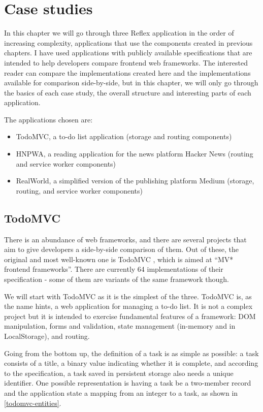 \documentclass[english,odsaz]{fitthesis}
\begin{document}
\chapter{Case studies}
\label{sec:orgefc6417}
In this chapter we will go through three Reflex application in the order of
increasing complexity, applications that use the components created in previous
chapters. I have used applications with publicly available specifications that
are intended to help developers compare frontend web frameworks. The interested
reader can compare the implementations created here and the implementations
available for comparison side-by-side, but in this chapter, we will only go
through the basics of each case study, the overall structure and interesting
parts of each application.

The applications chosen are:
\begin{itemize}
\item TodoMVC, a to-do list application (storage and routing components)
\item HNPWA, a reading application for the news platform Hacker News (routing and
service worker components)
\item RealWorld, a simplified version of the publishing platform Medium (storage,
routing, and service worker components)
\end{itemize}

\section{TodoMVC}
\label{sec:org6cca1a4}
There is an abundance of web frameworks, and there are several projects that aim
to give developers a side-by-side comparison of them. Out of these, the original
and most well-known one is TodoMVC \cite{todomvc}, which is aimed at ``MV* frontend
frameworks''. There are currently 64 implementations of their specification -
some of them are variants of the same framework though.

We will start with TodoMVC as it is the simplest of the three. TodoMVC is, as
the name hints, a web application for managing a to-do list. It is not a complex
project but it is intended to exercise fundamental features of a framework: DOM
manipulation, forms and validation, state management (in-memory and in
LocalStorage), and routing.

Going from the bottom up, the definition of a task is as simple as possible: a
task consists of a title, a binary value indicating whether it is complete, and
according to the specification, a task saved in persistent storage also needs a
unique identifier. One possible representation is having a task be a two-member
record and the application state a mapping from an integer to a task, as shown
in \ref{todomvc-entities}.
\end{document}
